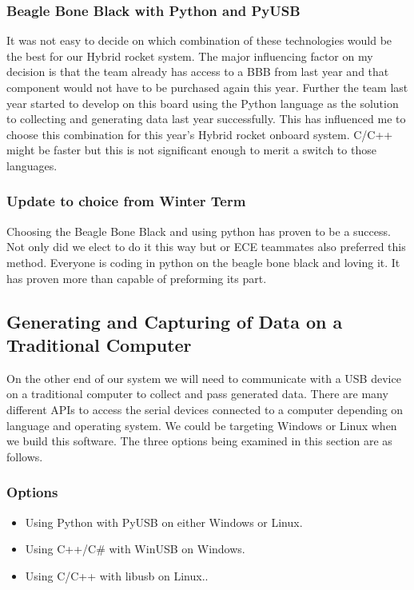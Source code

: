\documentclass[10pt,draftclsnofoot,onecolumn]{IEEEtran}
\begin{document}
\subsubsection{Beagle Bone Black with Python and PyUSB}
It was not easy to decide on which combination of these technologies would be the best for our Hybrid rocket system. The major influencing factor on my decision is that the team already has access to a BBB from last year and that component would not have to be purchased again this year. Further the team last year started to develop on this board using the Python language as the solution to collecting and generating data last year successfully. This has influenced me to choose this combination for this year's Hybrid rocket onboard system. C/C++ might be faster but this is not significant enough to merit a switch to those languages.\par

\subsubsection{Update to choice from Winter Term}
Choosing the Beagle Bone Black and using python has proven to be a success. Not only did we elect to do it this way but or ECE teammates also preferred this method. Everyone is coding in python on the beagle bone black and loving it. It has proven more than capable of preforming its part.

\subsection{Generating and Capturing of Data on a Traditional Computer}
On the other end of our system we will need to communicate with a USB device on a traditional computer to collect and pass generated data. There are many different APIs to access the serial devices connected to a computer depending on language and operating system. We could be targeting Windows or Linux when we build this software. 
The three options being examined in this section are as follows. \\
\subsubsection{Options}
	\begin{itemize}
	\item Using Python with PyUSB on either Windows or Linux.
	\item Using C++/C\# with WinUSB on Windows.
	\item Using C/C++ with libusb on Linux..\\
	\end{itemize}
\end{document}
